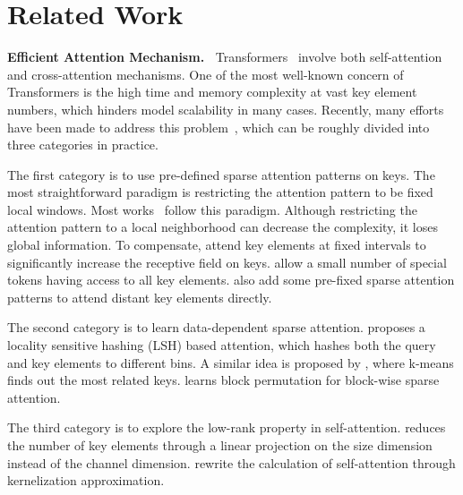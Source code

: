 \documentclass{article}
\begin{document}
 \section{Related Work}



\textbf{Efficient Attention Mechanism.~}
Transformers~\citep{vaswani2017attention} involve both self-attention and cross-attention mechanisms. One of the most well-known concern of Transformers is the high time and memory complexity at vast key element numbers, which hinders model scalability in many cases. Recently, many efforts have been made to address this problem~\citep{tay2020efficient}, which can be roughly divided into three categories in practice.


The first category is to use pre-defined sparse attention patterns on keys.
The most straightforward paradigm is restricting the attention pattern to be fixed local windows.
Most works~\citep{liu2018generating,parmar2018image,child2019generating,huang2019ccnet, ho2019axial,wang2020axial,hu2019local,ramachandran2019stand,qiu2019blockwise,beltagy2020longformer,ainslie2020etc,zaheer2020big} follow this paradigm.
Although restricting the attention pattern to a local neighborhood can decrease the complexity, it loses global information.
To compensate, \citet{child2019generating, huang2019ccnet, ho2019axial,wang2020axial} attend key elements at fixed intervals to significantly increase the receptive field on keys.
\citet{beltagy2020longformer,ainslie2020etc,zaheer2020big} allow a small number of special tokens having access to all key elements. \citet{zaheer2020big,qiu2019blockwise} also add some pre-fixed sparse attention patterns to attend distant key elements directly.

The second category is to learn data-dependent sparse attention. \citet{kitaev2020reformer} proposes a locality sensitive hashing (LSH) based attention, which hashes both the query and key elements to different bins. A similar idea is proposed by \citet{roy2020efficient}, where k-means finds out the most related keys. \citet{tay2020sparse} learns block permutation for block-wise sparse attention. 

The third category is to explore the low-rank property in self-attention. \citet{wang2020linformer} reduces the number of key elements through a linear projection on the size dimension instead of the channel dimension. \citet{katharopoulos2020transformers,choromanski2020masked} rewrite the calculation of self-attention through kernelization approximation.
\end{document}
